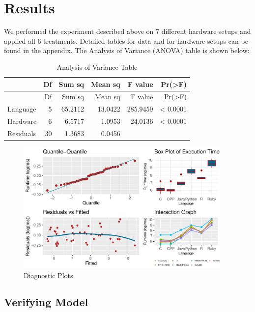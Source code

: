 \documentclass[12pt,halfline,a4paper,]{ouparticle}
\begin{document}
\newpage

\section{Results}\label{results}

We performed the experiment described above on 7 different hardware
setups and applied all 6 treatments. Detailed tables for data and for
hardware setups can be found in the appendix. The Analysis of Variance
(ANOVA) table is shown below:

\begin{longtable}[]{@{}lrrrrr@{}}
\caption{Analysis of Variance Table}\tabularnewline
\toprule\noalign{}
& Df & Sum sq & Mean sq & F value & Pr(\textgreater F) \\
\midrule\noalign{}
\endfirsthead
\toprule\noalign{}
& Df & Sum sq & Mean sq & F value & Pr(\textgreater F) \\
\midrule\noalign{}
\endhead
\bottomrule\noalign{}
\endlastfoot
Language & 5 & 65.2112 & 13.0422 & 285.9459 & \textless{} 0.0001 \\
Hardware & 6 & 6.5717 & 1.0953 & 24.0136 & \textless{} 0.0001 \\
Residuals & 30 & 1.3683 & 0.0456 & & \\
\end{longtable}

\begin{figure}[H]

{\centering \includegraphics[width=400px]{final_files/figure-latex/figAnova-1} 

}

\caption{Diagnostic Plots}\label{fig:figAnova}
\end{figure}

\subsection{Verifying Model}\label{verifying-model}
\end{document}
